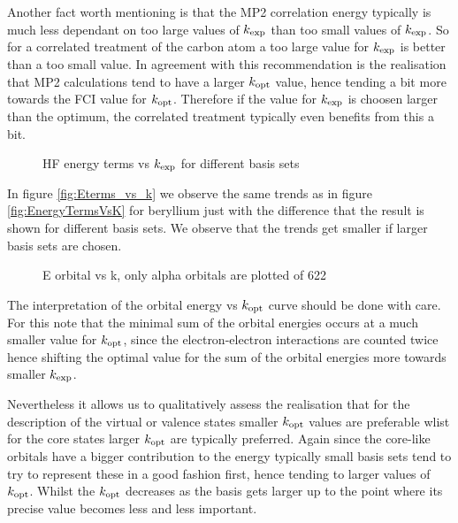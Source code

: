 Another fact worth mentioning is that the MP2 correlation energy typically
is much less dependant on too large values of $k_\text{exp}$ than too small values
of $k_\text{exp}$.
So for a correlated treatment of the carbon atom a too large value for $k_\text{exp}$
is better than a too small value.
In agreement with this recommendation is the realisation that
MP2 calculations tend to have a larger $k_\text{opt}$ value, hence tending a bit more
towards the FCI value for $k_\text{opt}$.
Therefore if the \HF value for $k_\text{exp}$ is choosen larger than the optimum,
the correlated treatment typically even benefits from this a bit.


\begin{figure}
	\centering
	\caption{HF energy terms vs $k_\text{exp}$ for different basis sets}
	\label{fig:Eterms_vs_k}
\end{figure}

In figure \vref{fig:Eterms_vs_k} we observe the same trends
as in figure \vref{fig:EnergyTermsVsK} for beryllium
just with the difference that
the result is shown for different basis sets.
We observe that the trends get smaller if larger basis sets are chosen.


\begin{figure}
	\centering
	\caption{E orbital vs k, only alpha orbitals are plotted of 622}
	\label{fig:orben_vs_k}
\end{figure}

The interpretation of the orbital energy vs $k_\text{opt}$ curve
should be done with care.
For this note that the minimal sum of the orbital energies
occurs at a much smaller value for $k_\text{opt}$,
since the electron-electron interactions are counted twice
hence shifting the optimal value for the sum of the orbital
energies more towards smaller $k_\text{exp}$.

Nevertheless it allows us to qualitatively assess the realisation
that for the description of the virtual or valence states
smaller $k_\text{opt}$ values are preferable wlist for the core states
larger $k_\text{opt}$ are typically preferred.
Again since the core-like orbitals have a bigger contribution
to the energy typically small basis sets tend to try to represent
these in a good fashion first, hence tending to larger values of $k_\text{opt}$.
Whilst the $k_\text{opt}$ decreases as the basis gets larger up to the point
where its precise value becomes less and less important.




